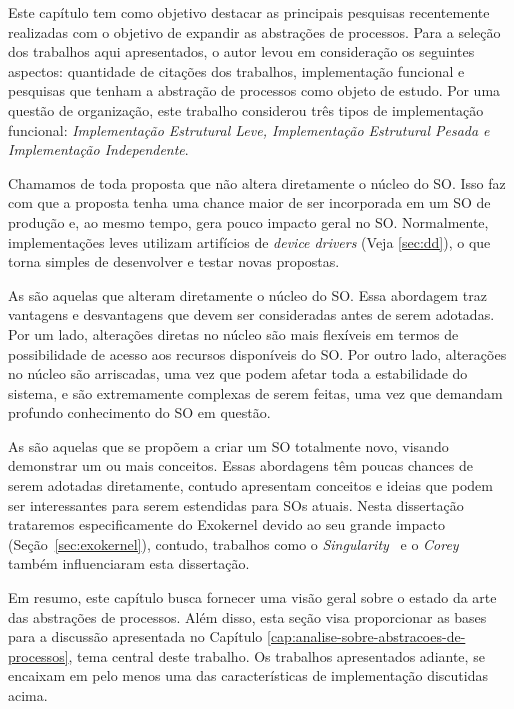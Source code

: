 \label{cap:trabalhos-analisados}

Este capítulo tem como objetivo destacar as principais pesquisas recentemente
realizadas com o objetivo de expandir as abstrações de processos. Para a
seleção dos trabalhos aqui apresentados, o autor levou em consideração os
seguintes aspectos: quantidade de citações dos trabalhos, implementação
funcional e pesquisas que tenham a abstração de processos como objeto de
estudo. Por uma questão de organização, este trabalho considerou três tipos de
implementação funcional: \textit{Implementação Estrutural Leve, Implementação
Estrutural Pesada e Implementação Independente}.

Chamamos de  toda proposta que não
altera diretamente o núcleo do SO. Isso faz com que a proposta tenha uma chance
maior de ser incorporada em um SO de produção e, ao mesmo tempo, gera pouco
impacto geral no SO. Normalmente, implementações leves utilizam artifícios de
\emph{device drivers} (Veja \ref{sec:dd}), o que torna simples de desenvolver e
testar novas propostas.

As  são aquelas que alteram
diretamente o núcleo do SO. Essa abordagem traz vantagens e desvantagens que
devem ser consideradas antes de serem adotadas. Por um lado, alterações diretas
no núcleo são mais flexíveis em termos de possibilidade de acesso aos recursos
disponíveis do SO. Por outro lado, alterações no núcleo são arriscadas, uma vez
que podem afetar toda a estabilidade do sistema, e são extremamente complexas
de serem feitas, uma vez que demandam profundo conhecimento do SO em questão.

As  são aquelas que se propõem a
criar um SO totalmente novo, visando demonstrar um ou mais conceitos. Essas
abordagens têm poucas chances de serem adotadas diretamente, contudo apresentam
conceitos e ideias que podem ser interessantes para serem estendidas para SOs
atuais. Nesta dissertação trataremos especificamente do Exokernel devido ao seu
grande impacto (Seção~\ref{sec:exokernel}), contudo, trabalhos como o
\emph{Singularity}~\citep{aiken} e o \emph{Corey}~\citep{corey} também
influenciaram esta dissertação.

Em resumo, este capítulo busca fornecer uma visão geral sobre o estado da arte
das abstrações de processos. Além disso, esta seção visa proporcionar as bases
para a discussão apresentada no Capítulo
\ref{cap:analise-sobre-abstracoes-de-processos}, tema central deste trabalho.
Os trabalhos apresentados adiante, se encaixam em pelo menos uma das
características de implementação discutidas acima.

